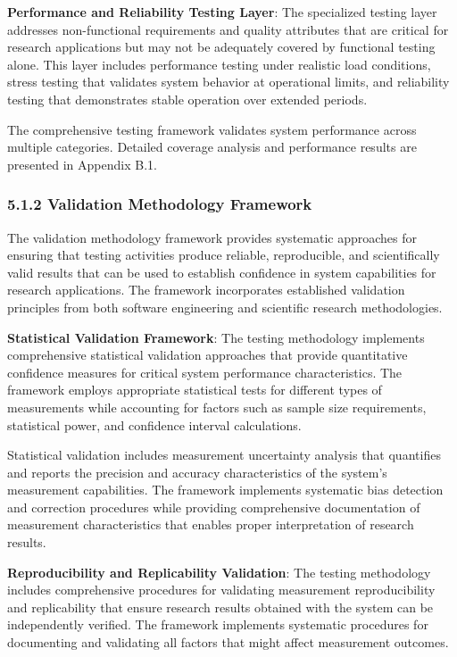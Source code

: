 \documentclass[12pt,a4paper]{article}
\begin{document}
\textbf{Performance and Reliability Testing Layer}: The specialized testing layer addresses non-functional requirements and
quality attributes that are critical for research applications but may not be adequately covered by functional testing
alone. This layer includes performance testing under realistic load conditions, stress testing that validates system
behavior at operational limits, and reliability testing that demonstrates stable operation over extended periods.

The comprehensive testing framework validates system performance across multiple categories. Detailed coverage analysis
and performance results are presented in Appendix B.1.

\subsubsection{5.1.2 Validation Methodology Framework}

The validation methodology framework provides systematic approaches for ensuring that testing activities produce
reliable, reproducible, and scientifically valid results that can be used to establish confidence in system capabilities
for research applications. The framework incorporates established validation principles from both software engineering
and scientific research methodologies.

\textbf{Statistical Validation Framework}: The testing methodology implements comprehensive statistical validation approaches
that provide quantitative confidence measures for critical system performance characteristics. The framework employs
appropriate statistical tests for different types of measurements while accounting for factors such as sample size
requirements, statistical power, and confidence interval calculations.

Statistical validation includes measurement uncertainty analysis that quantifies and reports the precision and accuracy
characteristics of the system's measurement capabilities. The framework implements systematic bias detection and
correction procedures while providing comprehensive documentation of measurement characteristics that enables proper
interpretation of research results.

\textbf{Reproducibility and Replicability Validation}: The testing methodology includes comprehensive procedures for
validating measurement reproducibility and replicability that ensure research results obtained with the system can be
independently verified. The framework implements systematic procedures for documenting and validating all factors that
might affect measurement outcomes.
\end{document}
